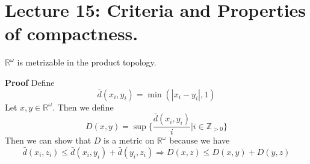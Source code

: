 \documentclass[main.tex]{subfiles}
\begin{document}
\pagestyle{plain}
\setcounter{chapter}{14}

\chapter{Lecture 15: Criteria and Properties of compactness. }
\label{chap:chapter15}

\begin{theorem}
    $\mathbb{R}^{\omega}$ is metrizable in the product topology.
\end{theorem}

\par \noindent \textbf{Proof} Define
\begin{equation}
    \bar{d}(x_i, y_i) = \min(|x_i - y_i|, 1)
\end{equation}
Let $x, y\in \mathbb{R}^{\omega}$. Then we define 
\begin{equation}
    D(x, y) = \sup \{ \frac{\bar{d}(x_i, y_i)}{i}| i\in \mathbb{Z}_{> 0}\}
\end{equation}
Then we can show that $D$ is a metric on $\mathbb{R}^{\omega}$ because we have 
\begin{equation}
    \bar{d}(x_i, z_i) \le \bar{d}(x_i, y_i) + \bar{d}(y_i, z_i) \Longrightarrow D(x, z) \le D(x, y) + D(y, z)
\end{equation}
\end{document}

